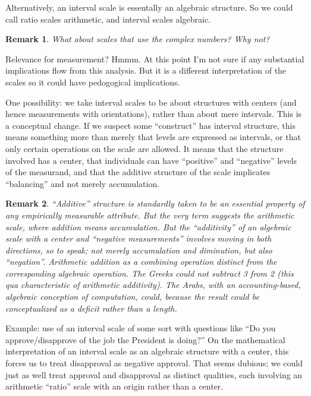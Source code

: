\documentclass[11pt,twoside]{article}
\newtheorem{remark}{Remark}
\begin{document}
Alternatively, an interval scale is essentally an algebraic structure.
So we could call ratio scales arithmetic, and interval scales
algebraic.

\begin{remark}
  What about scales that use the complex numbers?  Why not?
\end{remark}

Relevance for measurement?  Hmmm.  At this point I'm not sure if any
substantial implications flow from this analysis.  But it is a
different interpretation of the scales so it could have pedogogical
implications.

One possibility: we take interval scales to be about structures with
centers (and hence measurements with orientations), rather than about
mere intervals.  This is a conceptual change.  If we suspect some
``construct'' has interval structure, this means something more than
merely that levels are expressed as intervals, or that only certain
operations on the scale are allowed.  It means that the structure
involved has a center, that individuals can have ``positive'' and
``negative'' levels of the measurand, and that the additive structure
of the scale implicates ``balancing'' and not merely accumulation.

\begin{remark}
``Additive'' structure is standardly taken to be an essential property
  of any empirically measurable attribute.  But the very term suggests
  the arithmetic scale, where addition means accumulation.  But the
  ``additivity'' of an algebraic scale with a center and ``negative
  measurements'' involves moving in both directions, so to speak; not
  merely accumulation and diminution, but also ``negation''.
  Arithmetic addition as a combining operation distinct from the
  corresponding algebraic operation.  The Greeks could not subtract 3
  from 2 (this qua characteristic of arithmetic additivity).  The
  Arabs, with an accounting-based, algebraic conception of
  computation, could, because the result could be conceptualized as a
  deficit rather than a length.
\end{remark}

Example: use of an interval scale of some sort with questions like
``Do you approve/disapprove of the job the President is doing?''  On
the mathematical interpretation of an interval scale as an algebraic
structure with a center, this forces us to treat disapproval as
negative approval.  That seems dubious; we could just as well treat
approval and disapproval as distinct qualities, each involving
an arithmetic ``ratio'' scale with an origin rather than a center.
\end{document}

